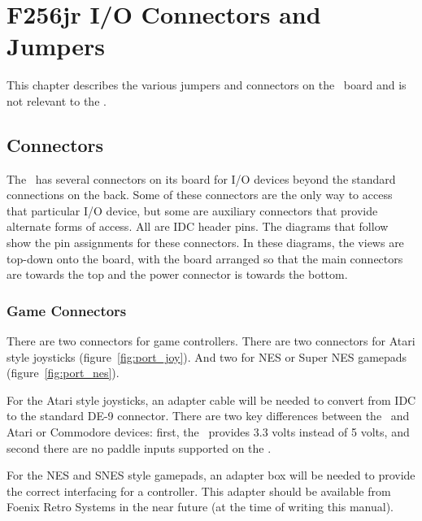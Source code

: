 \chapter{F256jr I/O Connectors and Jumpers}

\begin{note}
    This chapter describes the various jumpers and connectors on the \fjr\ board and is not relevant to the \fk.    
\end{note}

\section*{Connectors}

The \fjr\ has several connectors on its board for I/O devices beyond the standard connections on the back. Some of these connectors are the only way to access that particular I/O device, but some are auxiliary connectors that provide alternate forms of access. All are IDC header pins. The diagrams that follow show the pin assignments for these connectors. In these diagrams, the views are top-down onto the board, with the board arranged so that the main connectors are towards the top and the power connector is towards the bottom.

\subsection*{Game Connectors}

There are two connectors for game controllers. There are two connectors for Atari style joysticks (figure~\ref{fig:port_joy}). And two for NES or Super NES gamepads (figure~\ref{fig:port_nes}).

For the Atari style joysticks, an adapter cable will be needed to convert from IDC to the standard DE-9 connector. There are two key differences between the \fjr\ and Atari or Commodore devices: first, the \fjr\ provides 3.3 volts instead of 5 volts, and second there are no paddle inputs supported on the \fjr.

For the NES and SNES style gamepads, an adapter box will be needed to provide the correct interfacing for a controller. This adapter should be available from Foenix Retro Systems in the near future (at the time of writing this manual).

